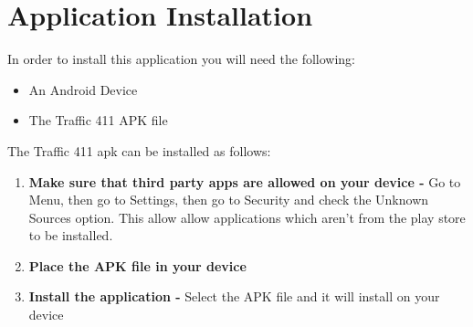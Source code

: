 \documentclass[a4paper,12pt]{article}
\begin{document}
\section{Application Installation}
In order to install this application you will need the following:
\begin{itemize}
\item An Android Device
\item The Traffic 411 APK file
\end{itemize}

The Traffic 411 apk can be installed as follows:
\begin{enumerate}
\item \textbf{Make sure that third party apps are allowed on your device -} Go to Menu, then go to Settings, then go to Security and check the Unknown Sources option. This allow allow applications which aren't from the play store to be installed.
\item \textbf{Place the APK file in your device} 
\item \textbf{Install the application -} Select the APK file and it will install on your device
\end{enumerate}
\end{document}
